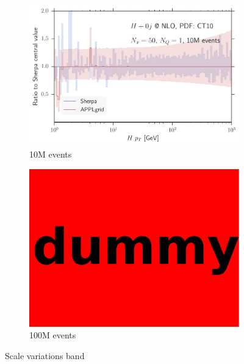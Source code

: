 %
\begin{figure}
\centering
\begin{subfigure}[]{0.49\textwidth}
	\includegraphics[width=\textwidth]{images/plot_scalesvar_band_hpt.pdf}
	\caption{10M events}
\end{subfigure}
\hfill
\begin{subfigure}[]{0.49\textwidth}
	\includegraphics[width=\textwidth]{images/dummy.pdf}
	\caption{100M events}
\end{subfigure}
\caption{Scale variations band}
\end{figure}
%
